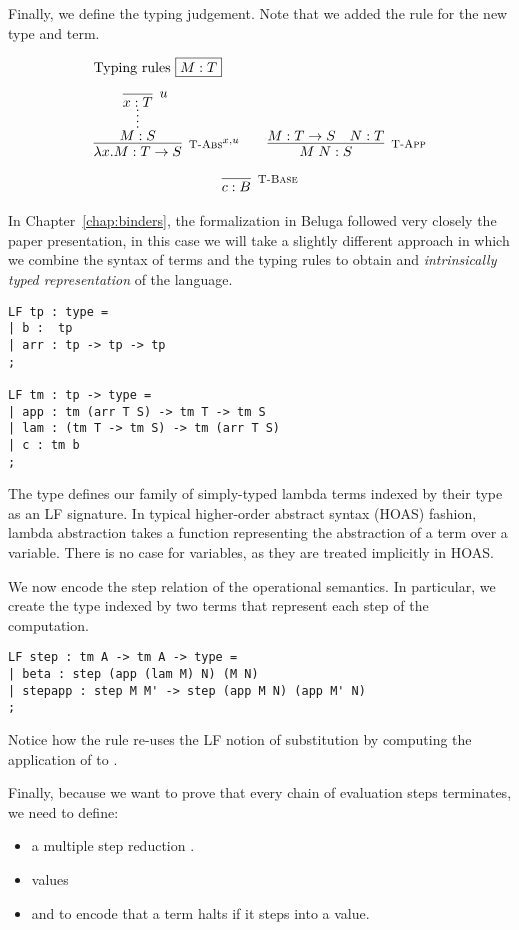 Finally, we define the typing judgement. Note that we added the rule
\TBase for the new type and term.

\[
\begin{array}{c@{\qquad}c}
\multicolumn{2}{l}{\mbox{Typing rules \fbox{$M:T$}}} \\[1em]
\infer[\TFn^{x,u}]{\lam x.M : T \arrow S}
                 {\infer*{M:S}{\infer[u]{x:T}{}}} &
\infer[\TApp]{M\;N : S}{M : T \arrow S & N:T} \\[1em]
\multicolumn{2}{c}{\infer[\TBase]{c : B}{}}
\end{array}
\]

In Chapter~\ref{chap:binders}, the formalization in Beluga followed
very closely the paper presentation, in this case we will take a
slightly different approach in which we combine the syntax of terms
and the typing rules to obtain and \emph{intrinsically typed
  representation} of the language.

\begin{lstlisting}
LF tp : type =
| b :  tp
| arr : tp -> tp -> tp
;

LF tm : tp -> type =
| app : tm (arr T S) -> tm T -> tm S
| lam : (tm T -> tm S) -> tm (arr T S)
| c : tm b
;
\end{lstlisting}

The type  defines our family of simply-typed lambda terms
indexed by their type as an LF signature. In typical higher-order
abstract syntax (HOAS) fashion, lambda abstraction takes a function
representing the abstraction of a term over a variable. There is no
case for variables, as they are treated implicitly in HOAS.

We now encode the step relation of the operational semantics. In
particular, we create the  type indexed by two terms that
represent each step of the computation.

\begin{lstlisting}
LF step : tm A -> tm A -> type =
| beta : step (app (lam M) N) (M N)
| stepapp : step M M' -> step (app M N) (app M' N)
;
\end{lstlisting}

Notice how the  rule re-uses the LF notion of substitution by
computing the application of  to .

Finally, because we want to prove that every chain of evaluation steps
terminates, we need to define:
\begin{itemize}
\item a multiple step reduction .
\item values 
\item and  to encode that a term halts if it steps into a value.
\end{itemize}

